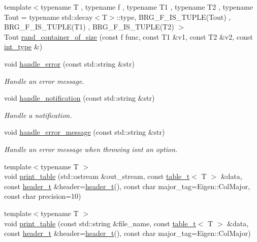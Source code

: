 \begin{DoxyCompactItemize}
\item 
{\footnotesize template$<$typename T , typename f , typename T1 , typename T2 , typename Tout  = typename std\+::decay$<$\+T$>$\+::type, B\+R\+G\+\_\+\+F\+\_\+\+I\+S\+\_\+\+T\+U\+P\+L\+E(\+Tout) , B\+R\+G\+\_\+\+F\+\_\+\+I\+S\+\_\+\+T\+U\+P\+L\+E(\+T1) , B\+R\+G\+\_\+\+F\+\_\+\+I\+S\+\_\+\+T\+U\+P\+L\+E(\+T2) $>$ }\\Tout \hyperlink{namespaceIceBRG_aefd19d7a32a95306171961805a41db18}{rand\+\_\+container\+\_\+of\+\_\+size} (const f func, const T1 \&v1, const T2 \&v2, const \hyperlink{lib_2IceBRG__main_2common_8h_ac4de9d9335536ac22821171deec8d39e}{int\+\_\+type} \&)
\item 
void \hyperlink{namespaceIceBRG_af9f5b4e0afa15ed2c2f25f06a66d8fff}{handle\+\_\+error} (const std\+::string \&str)
\begin{DoxyCompactList}\small\item\em Handle an error message. \end{DoxyCompactList}\item 
void \hyperlink{namespaceIceBRG_ab990faa42b7ef106893de947760421ce}{handle\+\_\+notification} (const std\+::string \&str)
\begin{DoxyCompactList}\small\item\em Handle a notification. \end{DoxyCompactList}\item 
void \hyperlink{namespaceIceBRG_a6f24276adcb82f30036bdef384bf674e}{handle\+\_\+error\+\_\+message} (const std\+::string \&str)
\begin{DoxyCompactList}\small\item\em Handle an error message when throwing isn\textquotesingle{}t an option. \end{DoxyCompactList}\item 
{\footnotesize template$<$typename T $>$ }\\void \hyperlink{namespaceIceBRG_ae53d90be96da8318b9d62188970ce1d7}{print\+\_\+table} (std\+::ostream \&out\+\_\+stream, const \hyperlink{namespaceIceBRG_a59734b1a7b525d7d926f69a91bc8553b}{table\+\_\+t}$<$ T $>$ \&data, const \hyperlink{namespaceIceBRG_a49e8b48f1dbd351e9748e7cbe80705df}{header\+\_\+t} \&header=\hyperlink{namespaceIceBRG_a49e8b48f1dbd351e9748e7cbe80705df}{header\+\_\+t}(), const char major\+\_\+tag=Eigen\+::\+Col\+Major, const char precision=10)
\item 
{\footnotesize template$<$typename T $>$ }\\void \hyperlink{namespaceIceBRG_ac15c03b00d4dc1d1fb843d1c5e8f9b01}{print\+\_\+table} (const std\+::string \&file\+\_\+name, const \hyperlink{namespaceIceBRG_a59734b1a7b525d7d926f69a91bc8553b}{table\+\_\+t}$<$ T $>$ \&data, const \hyperlink{namespaceIceBRG_a49e8b48f1dbd351e9748e7cbe80705df}{header\+\_\+t} \&header=\hyperlink{namespaceIceBRG_a49e8b48f1dbd351e9748e7cbe80705df}{header\+\_\+t}(), const char major\+\_\+tag=Eigen\+::\+Col\+Major)

\end{DoxyCompactItemize}
